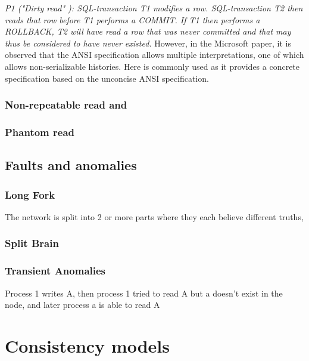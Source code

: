 \documentclass[a4paper,10pt,titlepage]{report}
\begin{document}
    \textit{P1 ("Dirty read" ): SQL-transaction T1 modifies a row. SQL-transaction T2 then reads that row before T1 performs a COMMIT. If T1 then performs a ROLLBACK, T2 will have read a row that was never committed and that may thus be considered to have never existed.} However, in the Microsoft paper, \cite{Berensonetal} it is observed that the ANSI specification allows multiple interpretations, one of which allows non-serializable histories. Here \cite{Adya99weakconsistency} is commonly used as it provides a concrete specification based on the unconcise ANSI specification.

    \subsubsection{Non-repeatable read and}

    \subsubsection{Phantom read}

    \subsection{Faults and anomalies}

    \subsubsection{Long Fork}
    The network is split into 2 or more parts where they each believe different truths,

    \subsubsection{Split Brain}

    \subsubsection{Transient Anomalies}
    Process 1 writes A, then process 1 tried to read A but a doesn't exist in the node, and later process a is able to read A

    \newpage


    \section{Consistency models}
\end{document}
